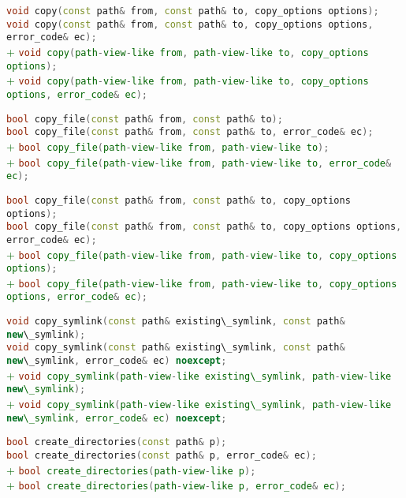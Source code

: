 \documentclass[11pt]{article}
\newcommand{\code}[2][cpp]{\lstinline[language=#1,basicstyle=\small\ttfamily]{#2}}
\newcommand{\tsreplace}[3]{\textcolor{red}{\sout{#1}}#2\textcolor{darkgreen}{#3}}
\begin{document}
\tsreplace{}{  \code{void copy(const path& from, const path& to, copy_options options);}}{}\\
\tsreplace{}{  \code{void copy(const path& from, const path& to, copy_options options, error_code& ec);}}{}\\
\tsreplace{}{}{+ \code{void copy(path-view-like from, path-view-like to, copy_options options);}}\\
\tsreplace{}{}{+ \code{void copy(path-view-like from, path-view-like to, copy_options options, error_code& ec);}}

\tsreplace{}{  \code{bool copy_file(const path& from, const path& to);}}{}\\
\tsreplace{}{  \code{bool copy_file(const path& from, const path& to, error_code& ec);}}{}\\
\tsreplace{}{}{+ \code{bool copy_file(path-view-like from, path-view-like to);}}\\
\tsreplace{}{}{+ \code{bool copy_file(path-view-like from, path-view-like to, error_code& ec);}}

\tsreplace{}{  \code{bool copy_file(const path& from, const path& to, copy_options options);}}{}\\
\tsreplace{}{  \code{bool copy_file(const path& from, const path& to, copy_options options, error_code& ec);}}{}\\
\tsreplace{}{}{+ \code{bool copy_file(path-view-like from, path-view-like to, copy_options options);}}\\
\tsreplace{}{}{+ \code{bool copy_file(path-view-like from, path-view-like to, copy_options options, error_code& ec);}}

\tsreplace{}{  \code{void copy_symlink(const path& existing\_symlink, const path& new\_symlink);}}{}\\
\tsreplace{}{  \code{void copy_symlink(const path& existing\_symlink, const path& new\_symlink, error_code& ec) noexcept;}}{}\\
\tsreplace{}{}{+ \code{void copy_symlink(path-view-like existing\_symlink, path-view-like new\_symlink);}}\\
\tsreplace{}{}{+ \code{void copy_symlink(path-view-like existing\_symlink, path-view-like new\_symlink, error_code& ec) noexcept;}}

\tsreplace{}{  \code{bool create_directories(const path& p);}}{}\\
\tsreplace{}{  \code{bool create_directories(const path& p, error_code& ec);}}{}\\
\tsreplace{}{}{+ \code{bool create_directories(path-view-like p);}}\\
\tsreplace{}{}{+ \code{bool create_directories(path-view-like p, error_code& ec);}}
\end{document}
